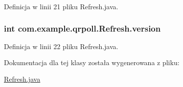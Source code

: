 Definicja w linii 21 pliku Refresh.\+java.

\hypertarget{classcom_1_1example_1_1qrpoll_1_1_refresh_ac9c9ddb92776f76a283dd629bf6acbf1}{
\subsubsection[{version}]{\setlength{\rightskip}{0pt plus 5cm}int com.\+example.\+qrpoll.\+Refresh.\+version\hspace{0.3cm}{\ttfamily [private]}}}\label{classcom_1_1example_1_1qrpoll_1_1_refresh_ac9c9ddb92776f76a283dd629bf6acbf1}


Definicja w linii 22 pliku Refresh.\+java.



Dokumentacja dla tej klasy została wygenerowana z pliku\+:\begin{DoxyCompactItemize}
\item 
\hyperlink{_refresh_8java}{Refresh.\+java}\end{DoxyCompactItemize}
